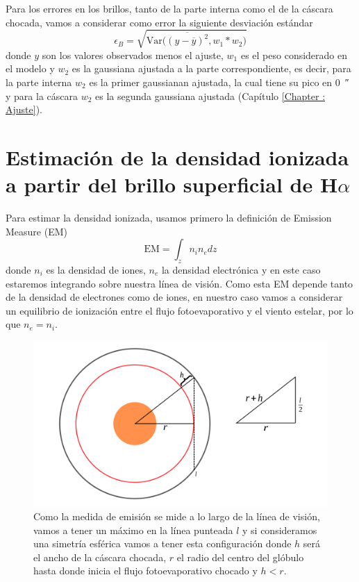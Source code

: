 \documentclass{book}
\begin{document}
Para los errores en los brillos, tanto de la parte interna como el de la cáscara chocada, vamos a considerar como error la siguiente desviación estándar
\[\epsilon_{B}=\sqrt{\mathrm{Var}\Big(\overline{(y-\overline{y})^2},w_1*w_2\Big)}\] 
donde $y$ son los valores observados menos el ajuste, $w_1$ es el peso considerado en el modelo  y $w_2$ es la gaussiana ajustada a la parte correspondiente, es decir, para la parte interna $w_2$ es la primer gaussianan ajustada, la cual tiene su pico en \SI{0}{\arcsecond} y para la cáscara $w_2$ es la segunda gaussiana ajustada (Capítulo \ref{Chapter : Ajuste}). 

\section{Estimación de la densidad ionizada a partir del brillo superficial de H$\alpha$}\label{Sec : estimacion de densidad}

Para estimar la densidad ionizada, usamos primero la definición de Emission Measure (EM)
\[\mathrm{EM}=\int_z n_i n_edz\] donde $n_i$ es la densidad de iones, $n_e$ la densidad electrónica y en este caso estaremos integrando sobre nuestra línea de visión. Como esta EM depende tanto de la densidad de electrones como de iones, en nuestro caso vamos a considerar un equilibrio de ionización entre el flujo fotoevaporativo y el viento estelar, por lo que $n_e=n_i$.

\begin{figure}[htb]
    \centering    \includegraphics[width=\textwidth]{artesanales/ImgFi01-4.pdf}
    \caption{Como la medida de emisión se mide a lo largo de la línea de visión, vamos a tener un máximo en la línea punteada $l$ y si consideramos una simetría esférica vamos a tener esta configuración donde $h$ será el ancho de la cáscara chocada, $r$ el radio del centro del glóbulo hasta donde inicia el flujo fotoevaporativo chocado y $h<r$.}
    \label{fig:EM}
\end{figure}
\end{document}
